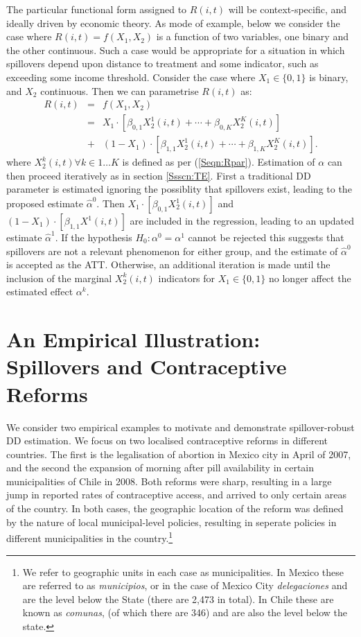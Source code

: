 The particular functional form assigned to $R(i,t)$ will be context-specific,
and ideally driven by economic theory.  As mode of example, below we consider the
case where $R(i,t)=f(X_1,X_2)$ is a function of two variables, one binary and
the other continuous.  Such a case would be appropriate for a situation in which
spillovers depend upon distance to treatment and some indicator, such as exceeding
some income threshold.  Consider the case where $X_1\in \{0,1\}$ is binary, and 
$X_2$ continuous.  Then we can parametrise $R(i,t)$ as:
\begin{eqnarray}
R(i,t)&=&f(X_1,X_2) \nonumber \\
      &=&X_1\cdot[\beta_{0,1}X_2^1(i,t)+ \cdots + \beta_{0,K}X_2^K(i,t)] \nonumber \\
      &+& (1-X_1)\cdot[\beta_{1,1}X_2^1(i,t)+ \cdots + \beta_{1,K}X_2^K(i,t)]. \nonumber
\end{eqnarray}
where $X_2^k(i,t) \forall k \in 1\ldots K$ is defined as per (\ref{Seqn:Rpar}).  
Estimation of $\alpha$ 
can then proceed iteratively as in section \ref{Ssscn:TE}.  First a traditional 
DD parameter is estimated ignoring the possiblity that spillovers exist, leading 
to the proposed estimate $\hat\alpha^0$.  Then $X_1\cdot[\beta_{0,1}X_2^1(i,t)]$ 
and $(1-X_1)\cdot[\beta_{1,1}X^1(i,t)]$ are included in the regression, leading to 
an updated estimate $\hat\alpha^1$.  If the hypothesis $H_0: \alpha^0=\alpha^1$ 
cannot be rejected this suggests that spillovers are not a relevant phenomenon 
for either group, and the estimate of $\hat\alpha^0$ is accepted as the ATT.  
Otherwise, an additional iteration is made until the inclusion of the marginal 
$X_2^k(i,t)$ indicators for $X_1 \in \{0,1\}$ no longer affect the estimated 
effect $\alpha^k$.

\section{An Empirical Illustration: Spillovers and Contraceptive Reforms}
\label{Sscn:empirics}
We consider two empirical examples to motivate and demonstrate spillover-robust 
DD estimation.
We focus on two localised contraceptive reforms in different countries. The first
is the legalisation of abortion in Mexico city in April of 2007, and the second
the expansion of morning after pill availability in certain municipalities of 
Chile in 2008.  Both reforms were sharp, resulting in a large jump in reported
rates of contraceptive access, and arrived to only certain areas of the country.
In both cases, the geographic location of the reform was defined by the nature
of local municipal-level policies, resulting in seperate policies in different
municipalities in the country.\footnote{We refer to geographic units in each case
as municipalities.  In Mexico these are referred to as \emph{municipios}, or in 
the case of Mexico City \emph{delegaciones} and are the level below the State 
(there are 2,473 in total).  In Chile these are known as \emph{comunas}, (of 
which there are 346) and are also the level below the state.}

